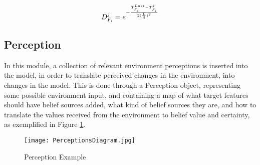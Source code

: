 \begin{equation}
    D^j_{F_i} = e^{-\frac{T^{Last}_{F_i} - T^j_{F_i}}{2(\frac{L}{4})^2}}
\label{eq:TimeValue}
\end{equation}


% 

\subsection{Perception}
In this module, a collection of relevant environment perceptions is inserted into the model, in order to translate perceived changes in the environment, into changes in the model. This is done through a Perception object, representing some possible environment input, and containing a map of what target features should have belief sources added, what kind of belief sources they are, and how to translate the values received from the environment to belief value and certainty, as exemplified in Figure \ref{fig:Perceptions Diagram}.

\begin{figure}[hbt]
    \centering
    \texttt{[image: PerceptionsDiagram.jpg]}
    \caption{Perception Example}
    \label{fig:Perceptions Diagram}
\end{figure}

